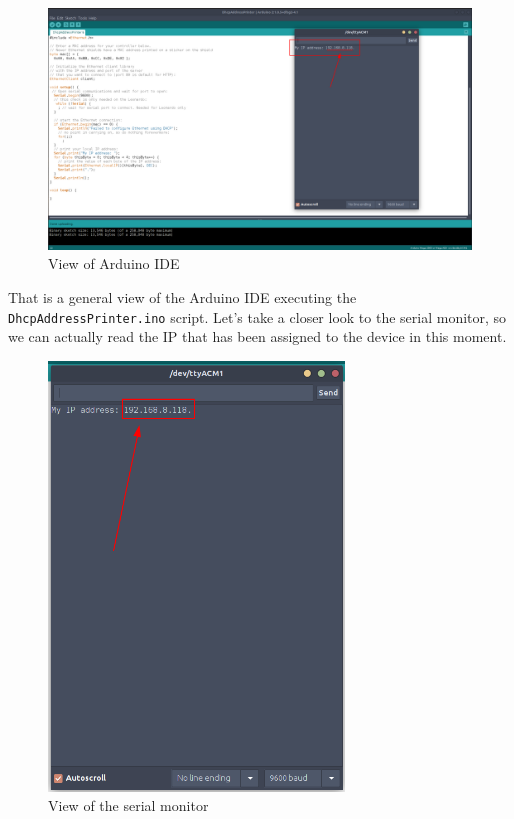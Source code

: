 \begin{figure}[H]
    \centering
    \includegraphics[width=1\textwidth]{fig/assign-ip.png}
    \caption{View of Arduino IDE}
    \label{fig:assign-ip}
\end{figure}

That is a general view of the Arduino IDE executing the \verb|DhcpAddressPrinter.ino| script. Let's take a closer look to the serial monitor, so we can actually read the IP that has been assigned to the device in this moment.

\begin{figure}[H]
    \centering
    \includegraphics[width=0.7\textwidth]{fig/serial-monitor-ip.png}
    \caption{View of the serial monitor}
    \label{fig:serial-monitor-ip}
\end{figure}

